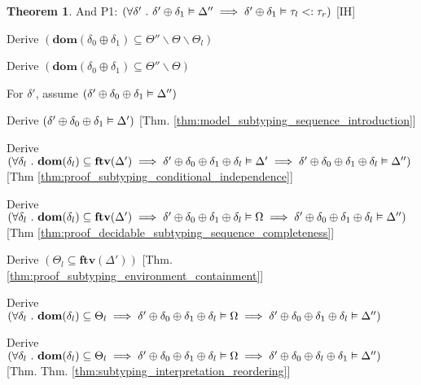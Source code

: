 \documentclass[acmsmall]{acmart}
\theoremstyle{definition}
\newtheorem{theorem}{Theorem}[section]
\begin{document}
\begin{theorem}
  \item \I \N And P1: $(
    \forall \delta' \ .\ 
    \delta' \oplus \delta_1 \vDash \Delta''
    \implies
    \delta' \oplus \delta_1 \vDash \tau_l <: \tau_r
  )$ [IH]

  \item \I \N Derive $(
    \textbf{dom}(\delta_0 \oplus \delta_1) \subseteq \Theta'' \backslash \Theta \backslash \Theta_l
  )$

  \item \I \N Derive $(
    \textbf{dom}(\delta_0 \oplus \delta_1) \subseteq \Theta'' \backslash \Theta
  )$

  \item \I \N For $\delta'$, assume $(
    \delta' \oplus \delta_0 \oplus \delta_1 \vDash \Delta''
  )$ 

  \item \I\I \N Derive $(
    \delta' \oplus \delta_0 \oplus \delta_1 \vDash \Delta'
  )$ [Thm. \ref{thm:model_subtyping_sequence_introduction}]

  \item \I\I \N Derive $(
    \forall \delta_l \ .\ 
    \textbf{dom}(\delta_l) \subseteq \textbf{ftv}(\Delta')
    \implies
    \delta' \oplus \delta_0 \oplus \delta_1 \oplus \delta_l \vDash \Delta' 
    \implies
    \delta' \oplus \delta_0 \oplus \delta_1 \oplus \delta_l \vDash \Delta''
  )$ [Thm \ref{thm:proof_subtyping_conditional_independence}]


  \item \I\I \N Derive $(
    \forall \delta_l \ .\ 
    \textbf{dom}(\delta_l) \subseteq \textbf{ftv}(\Delta')
    \implies
    \delta' \oplus \delta_0 \oplus \delta_1 \oplus \delta_l \vDash \Omega 
    \implies
    \delta' \oplus \delta_0 \oplus \delta_1 \oplus \delta_l \vDash \Delta''
  )$ [Thm \ref{thm:proof_decidable_subtyping_sequence_completeness}]

  \item \I\I \N Derive $(
    \Theta_l \subseteq \textbf{ftv}(\Delta')
  )$ [Thm. \ref{thm:proof_subtyping_environment_containment}]

  \item \I\I \N Derive $(
    \forall \delta_l \ .\ 
    \textbf{dom}(\delta_l) \subseteq \Theta_l 
    \implies
    \delta' \oplus \delta_0 \oplus \delta_1 \oplus \delta_l \vDash \Omega
    \implies
    \delta' \oplus \delta_0 \oplus \delta_1 \oplus \delta_l \vDash \Delta''
  )$ 

  \item \I\I \N Derive $(
    \forall \delta_l \ .\ 
    \textbf{dom}(\delta_l) \subseteq \Theta_l 
    \implies
    \delta' \oplus \delta_0 \oplus \delta_1 \oplus \delta_l \vDash \Omega
    \implies
    \delta' \oplus \delta_0 \oplus \delta_l \oplus \delta_1 \vDash \Delta''
  )$ [Thm. Thm. \ref{thm:subtyping_interpretation_reordering}]


\end{theorem}
\end{document}
